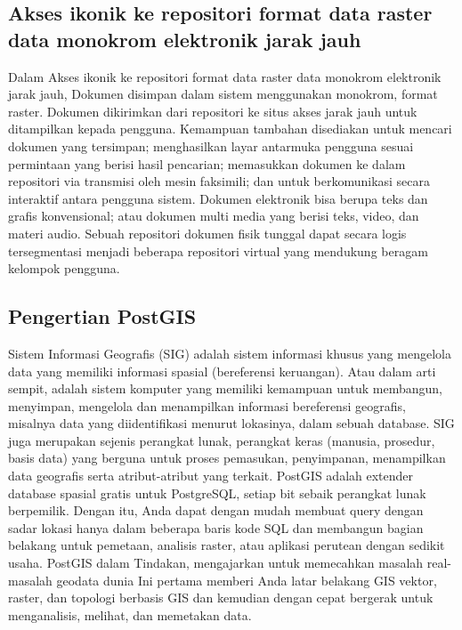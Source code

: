 \subsection{Akses ikonik ke repositori format data raster data monokrom elektronik jarak jauh}
Dalam Akses ikonik ke repositori format data raster data monokrom elektronik jarak jauh, 
Dokumen disimpan dalam sistem menggunakan monokrom, format raster. 
Dokumen dikirimkan dari repositori ke situs akses jarak jauh untuk ditampilkan kepada pengguna. 
Kemampuan tambahan disediakan untuk mencari dokumen yang tersimpan; 
menghasilkan layar antarmuka pengguna sesuai permintaan yang berisi hasil pencarian; 
memasukkan dokumen ke dalam repositori via transmisi oleh mesin faksimili; 
dan untuk berkomunikasi secara interaktif antara pengguna sistem. 
Dokumen elektronik bisa berupa teks dan grafis konvensional; 
atau dokumen multi media yang berisi teks, video, dan materi audio. 
Sebuah repositori dokumen fisik tunggal dapat secara logis tersegmentasi menjadi
beberapa repositori virtual yang mendukung beragam kelompok pengguna.

\subsection{Pengertian PostGIS}
Sistem Informasi Geografis (SIG) adalah sistem informasi khusus yang mengelola data yang memiliki informasi spasial (bereferensi keruangan). 
Atau dalam arti sempit, adalah sistem komputer yang memiliki kemampuan untuk membangun,
menyimpan, mengelola dan menampilkan informasi bereferensi geografis, misalnya data yang diidentifikasi menurut lokasinya, dalam sebuah database.
SIG juga merupakan sejenis perangkat lunak, perangkat keras (manusia, prosedur, basis data) yang berguna untuk proses pemasukan, penyimpanan, menampilkan data geografis serta atribut-atribut yang terkait.
PostGIS adalah extender database spasial gratis untuk PostgreSQL, 
setiap bit sebaik perangkat lunak berpemilik. Dengan itu, 
Anda dapat dengan mudah membuat query dengan sadar lokasi hanya dalam beberapa baris kode SQL 
dan membangun bagian belakang untuk pemetaan, analisis raster, 
atau aplikasi perutean dengan sedikit usaha. 
PostGIS dalam Tindakan, mengajarkan untuk memecahkan masalah real- 
masalah geodata dunia Ini pertama memberi Anda latar belakang GIS vektor,
raster, dan topologi berbasis GIS dan kemudian dengan cepat bergerak 
untuk menganalisis, melihat, dan memetakan data.


